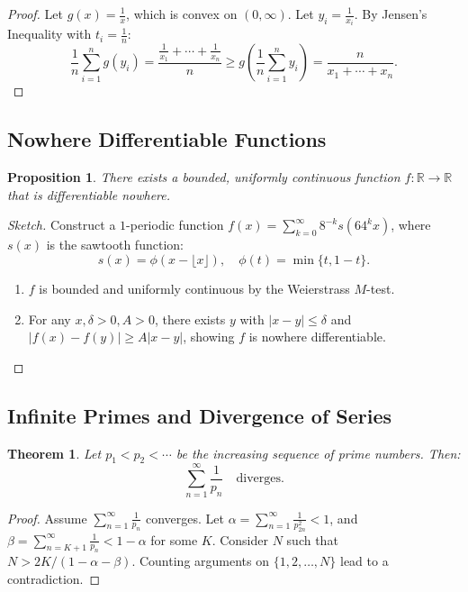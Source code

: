 \documentclass[9pt]{article}
\theoremstyle{definition}
\theoremstyle{plain}
\newtheorem{theorem}{Theorem}
\newtheorem{proposition}{Proposition}
\begin{document}
\begin{proof}
Let \( g(x) = \frac{1}{x} \), which is convex on \( (0, \infty) \). Let \( y_i = \frac{1}{x_i} \). By Jensen’s Inequality with \( t_i = \frac{1}{n} \):
\[
\frac{1}{n} \sum_{i=1}^n g(y_i) = \frac{\frac{1}{x_1} + \cdots + \frac{1}{x_n}}{n} \geq g\left(\frac{1}{n} \sum_{i=1}^n y_i\right) = \frac{n}{x_1 + \cdots + x_n}.
\]
\end{proof}

\subsection*{Nowhere Differentiable Functions}
\begin{proposition}
There exists a bounded, uniformly continuous function \( f : \mathbb{R} \to \mathbb{R} \) that is differentiable nowhere.
\end{proposition}

\begin{proof}[Sketch]
Construct a \( 1 \)-periodic function \( f(x) = \sum_{k=0}^\infty 8^{-k}s(64^k x) \), where \( s(x) \) is the sawtooth function:
\[
s(x) = \phi(x - \lfloor x \rfloor), \quad \phi(t) = \min\{t, 1-t\}.
\]
\begin{enumerate}
    \item \( f \) is bounded and uniformly continuous by the Weierstrass \( M \)-test.
    \item For any \( x, \delta > 0, A > 0 \), there exists \( y \) with \( |x - y| \leq \delta \) and \( |f(x) - f(y)| \geq A|x - y| \), showing \( f \) is nowhere differentiable.
\end{enumerate}
\end{proof}

\subsection*{Infinite Primes and Divergence of Series}
\begin{theorem}
Let \( p_1 < p_2 < \cdots \) be the increasing sequence of prime numbers. Then:
\[
\sum_{n=1}^\infty \frac{1}{p_n} \quad \text{diverges}.
\]
\end{theorem}

\begin{proof}
Assume \( \sum_{n=1}^\infty \frac{1}{p_n} \) converges. Let \( \alpha = \sum_{n=1}^\infty \frac{1}{p_{2n}^2} < 1 \), and \( \beta = \sum_{n=K+1}^\infty \frac{1}{p_n} < 1 - \alpha \) for some \( K \). Consider \( N \) such that \( N > 2K/(1 - \alpha - \beta) \). Counting arguments on \( \{1, 2, \ldots, N\} \) lead to a contradiction.
\end{proof}
\end{document}
